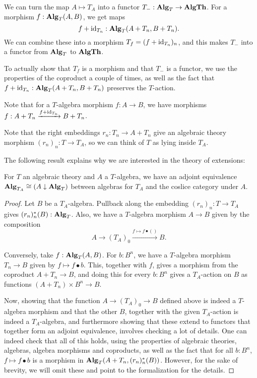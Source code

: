 \begin{remark}
  We can turn the map $ A \mapsto T_A $ into a functor $ T_- : \mathbf{Alg}_{T} \to \mathbf{AlgTh} $. For a morphism $ f: \mathbf{Alg}_{T}(A, B) $, we get maps
  \[ f + \text{id}_{T_n} : \mathbf{Alg}_{T}(A + T_n, B + T_n). \]
  We can combine these into a morphism $ T_f = (f + \text{id}_{T_n})_n $, and this makes $ T_- $ into a functor from $ \mathbf{Alg}_{T} $ to $ \mathbf{AlgTh} $.

  To actually show that $ T_f $ is a morphism and that $ T_- $ is a functor, we use the properties of the coproduct a couple of times, as well as the fact that $ f + \text{id}_{T_n} : \mathbf{Alg}_{T}(A + T_n, B + T_n) $ preserves the $ T $-action.
\end{remark}

\begin{remark}
  Note that for a $ T $-algebra morphism $ f: A \to B $, we have morphisms $ f: A + T_n \xrightarrow{f + \text{id}_{T_n}} B + T_n $.
\end{remark}

\begin{remark}
  Note that the right embeddings $ r_n : T_n \to A + T_n $ give an algebraic theory morphism $ (r_n)_n : T \to T_A $, so we can think of $ T $ as lying inside $ T_A $.
\end{remark}

The following result explains why we are interested in the theory of extensions:
\begin{lemma}\label{lem:extensions-algebra-coslice}
  For $ T $ an algebraic theory and $ A $ a $ T $-algebra, we have an adjoint equivalence $ \mathbf{Alg}_{T_A} \cong (A \downarrow \mathbf{Alg}_{T}) $ between algebras for $ T_A $ and the coslice category under $ A $.
\end{lemma}
\begin{proof}
  Let $ B $ be a $ T_A $-algebra. Pullback along the embedding $ (r_n)_n : T \to T_A $ gives $ (r_n)_n^*(B) : \mathbf{Alg}_{T} $. Also, we have a $ T $-algebra morphism $ A \to B $ given by the composition
  \[ A \to (T_A)_0 \xrightarrow{f \mapsto f \bullet ()} B. \]

  Conversely, take $ f: \mathbf{Alg}_{T}(A, B) $. For $ b: B^n $, we have a $ T $-algebra morphism $ T_n \to B $ given by $ f \mapsto f \bullet b $. This, together with $ f $, gives a morphism from the coproduct $ A + T_n \to B $, and doing this for every $ b: B^n $ gives a $ T_A $-action on $ B $ as functions $ (A + T_n) \times B^n \to B $.

  Now, showing that the function $ A \to (T_A)_0 \to B $ defined above is indeed a $ T $-algebra morphism and that the other $ B $, together with the given $ T_A $-action is indeed a $ T_A $-algebra, and furthermore showing that these extend to functors that together form an adjoint equivalence, involves checking a lot of details. One can indeed check that all of this holds, using the properties of algebraic theories, algebras, algebra morphisms and coproducts, as well as the fact that for all $ b : B^n $, $ f \mapsto f \bullet b $ is a morphism in $ \mathbf{Alg}_{T}(A + T_n, (r_n)_n^*(B)) $. However, for the sake of brevity, we will omit these and point to the formalization for the details.
\end{proof}

